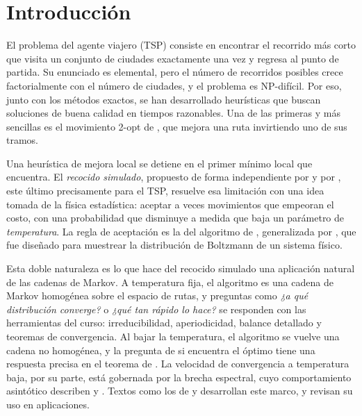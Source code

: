 
\section{Introducción}
\label{sec:introduccion}

El problema del agente viajero (TSP) consiste en encontrar el recorrido
más corto que visita un conjunto de ciudades exactamente una vez y
regresa al punto de partida. Su enunciado es elemental, pero el número
de recorridos posibles crece factorialmente con el número de ciudades,
y el problema es NP-difícil. Por eso, junto con los métodos exactos, se
han desarrollado heurísticas que buscan soluciones de buena calidad en
tiempos razonables. Una de las primeras y más sencillas es el
movimiento 2-opt de \citet{croes1958}, que mejora una ruta invirtiendo
uno de sus tramos.

Una heurística de mejora local se detiene en el primer mínimo local que
encuentra. El \emph{recocido simulado}, propuesto de forma
independiente por \citet{kirkpatrick1983} y por \citet{cerny1985}, este
último precisamente para el TSP, resuelve esa limitación con una idea
tomada de la física estadística: aceptar a veces movimientos que
empeoran el costo, con una probabilidad que disminuye a medida que baja
un parámetro de \emph{temperatura}. La regla de aceptación es la del
algoritmo de \citet{metropolis1953}, generalizada por
\citet{hastings1970}, que fue diseñado para muestrear la distribución
de Boltzmann de un sistema físico.

Esta doble naturaleza es lo que hace del recocido simulado una
aplicación natural de las cadenas de Markov. A temperatura fija, el
algoritmo es una cadena de Markov homogénea sobre el espacio de rutas,
y preguntas como \emph{¿a qué distribución converge?} o \emph{¿qué tan
rápido lo hace?} se responden con las herramientas del curso:
irreducibilidad, aperiodicidad, balance detallado y teoremas de
convergencia. Al bajar la temperatura, el algoritmo se vuelve una
cadena no homogénea, y la pregunta de si encuentra el óptimo tiene una
respuesta precisa en el teorema de \citet{hajek1988}. La velocidad de
convergencia a temperatura baja, por su parte, está gobernada por la
brecha espectral, cuyo comportamiento asintótico describen
\citet{holley1988} y \citet{holley1989}. Textos como los de
\citet{levin2017} y \citet{bremaud2020} desarrollan este marco, y
\citet{delahaye2019} revisan su uso en aplicaciones.

